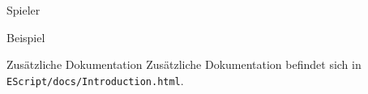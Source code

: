 \documentclass[ucs,9pt]{beamer}
\begin{document}
\begin{frame}{Spieler}
	\begin{block}{Beispiel}
		
	\end{block}
\end{frame}

\begin{frame}{Zusätzliche Dokumentation}
	Zusätzliche Dokumentation befindet sich in \texttt{EScript/docs/Introduction.html}.
\end{frame}

\HNIlastframe
\end{document}
